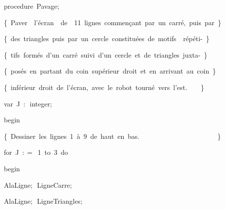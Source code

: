 {\pagebreak[3] 
\vspace{\neglskip}\mbox{\blc  \blk\idt  \mcl procedure\idt \ Pavage$;$}\par 
\vspace{\neglskip}\mbox{\blc  \blk\blk\idt  \cmt  \{\ Paver\ \ l{'}\'{e}cran\ \ de\ \ 11\ lignes\ commen\c{c}ant\ par\ un\ carr\'{e},\ puis\ par\ \}\idt }\par 
\vspace{\neglskip}\mbox{\blc  \blk\blk\idt  \cmt  \{\ des\ triangles\ puis\ par\ un\ cercle\ constitu\'{e}es\ de\ motifs\ \ r\'{e}p\'{e}ti-\ \}\idt }\par 
\vspace{\neglskip}\mbox{\blc  \blk\blk\idt  \cmt  \{\ tifs\ form\'{e}s\ d{'}un\ carr\'{e}\ suivi\ d{'}un\ cercle\ et\ de\ triangles\ juxta-\ \}\idt }\par 
\vspace{\neglskip}\mbox{\blc  \blk\blk\idt  \cmt  \{\ pos\'{e}s\ en\ partant\ du\ coin\ sup\'{e}rieur\ droit\ et\ en\ arrivant\ au\ coin\ \}\idt }\par 
\vspace{\neglskip}\mbox{\blc  \blk\blk\idt  \cmt  \{\ inf\'{e}rieur\ droit\ de\ l{'}\'{e}cran,\ avec\ le\ robot\ tourn\'{e}\ vers\ l{'}est.\ \ \ \ \}\idt }\par 
\pagebreak[3] 
\vspace{\neglskip}\mbox{\blc  \blk\blk\idt  \mcl var\idt \ J\ $:$\ integer$;$}\par 
\vspace{\neglskip}\mbox{\blc  \blk\idt  \mcl begin\idt }\par 
\vspace{\neglskip}\mbox{\blc  \blk\blk\idt  \cmt  \{\ Dessiner\ les\ lignes\ 1\ \`{a}\ 9\ de\ haut\ en\ bas.\ \ \ \ \ \ \ \ \ \ \ \ \ \ \ \ \ \ \ \ \ \ \ \}\idt }\par 
\pagebreak[3] 
\vspace{\neglskip}\mbox{\blc  \blk\blk\idt  \mcl for\idt \ J\ $:$$=$\ 1\ \mcl to\idt \ 3\ \mcl do\idt }\par 
\vspace{\neglskip}\mbox{\blc  \blk\blk\blk\idt  \mcl begin\idt }\par 
\vspace{\neglskip}\mbox{\blc  \blk\blk\blk\blk\idt  AlaLigne$;$\ LigneCarre$;$}\par 
\vspace{\neglskip}\mbox{\blc  \blk\blk\blk\blk\idt  AlaLigne$;$\ LigneTriangles$;$}\par 
}
